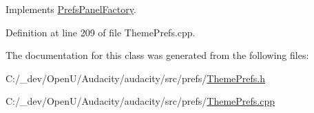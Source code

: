 Implements \hyperlink{class_prefs_panel_factory_a4814184d6050665a43f4929caa73aa0c}{Prefs\+Panel\+Factory}.



Definition at line 209 of file Theme\+Prefs.\+cpp.



The documentation for this class was generated from the following files\+:\begin{DoxyCompactItemize}
\item 
C\+:/\+\_\+dev/\+Open\+U/\+Audacity/audacity/src/prefs/\hyperlink{_theme_prefs_8h}{Theme\+Prefs.\+h}\item 
C\+:/\+\_\+dev/\+Open\+U/\+Audacity/audacity/src/prefs/\hyperlink{_theme_prefs_8cpp}{Theme\+Prefs.\+cpp}\end{DoxyCompactItemize}

